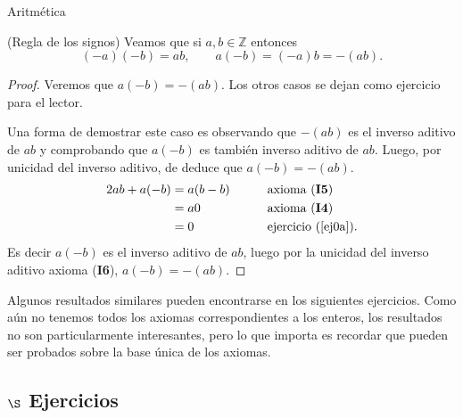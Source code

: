 \begin{section}{Aritmética}
%
%
%
%
%


\begin{ejemplo} (Regla de los signos) Veamos que  si $a,b \in \mathbb Z$ entonces
$$
(-a)(-b) = ab ,\qquad a(-b) = (-a)b = -(ab).
$$
\end{ejemplo}
\begin{proof}
Veremos que  $a(-b) = -(ab)$. Los otros casos se dejan como ejercicio para el lector.

Una forma de demostrar este caso es  observando que $-(ab)$ es el inverso aditivo de $ab$ y comprobando que $a(-b)$ es también inverso aditivo de $ab$. Luego, por unicidad del inverso aditivo, de deduce que $a(-b) = -(ab)$. 
\begin{alignat*}2
ab + a(-b) &=a(b-b) &\qquad &\text{axioma ({\bf I5})} \\
&=a0 &\qquad &\text{axioma ({\bf I4})}\\
&= 0 &\qquad &\text{ejercicio (\ref{ej0a})}.
\end{alignat*}
Es decir $a(-b)$ es el inverso aditivo de $ab$, luego por la unicidad del inverso aditivo axioma ({\bf I6}), $a(-b)=-(ab)$.
\end{proof}


Algunos resultados similares pueden encontrarse en los siguientes ejercicios. Como aún no tenemos todos los axiomas correspondientes a los enteros, los resultados no son particularmente interesantes, pero lo que importa es recordar que pueden ser probados sobre la base única de los axiomas.

\subsection*{\Large $\S$ Ejercicios}


\end{section}
